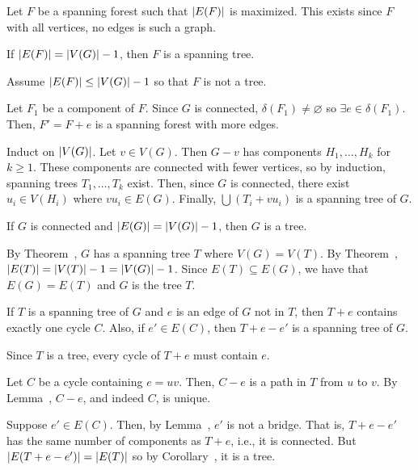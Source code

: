 \begin{prf}
  Let $F$ be a spanning forest such that $\abs{E(F)}$ is maximized.
  This exists since $F$ with all vertices, no edges is such a graph.

  If $\abs{E(F)} = \abs{V(G)} - 1$,
  then $F$ is a spanning tree.

  Assume $\abs{E(F)} \leq \abs{V(G)} - 1$
  so that $F$ is not a tree.

  Let $F_1$ be a component of $F$.
  Since $G$ is connected, $\delta(F_1) \neq \varnothing$
  so $\exists e \in \delta(F_1)$.
  Then, $F' = F + e$ is a spanning forest with more edges.
\end{prf}

\begin{prf}[cute]
  Induct on $\abs{V(G)}$.
  Let $v \in V(G)$. Then $G-v$ has components $H_1,\dotsc,H_k$ for $k \geq 1$.
  These components are connected with fewer vertices,
  so by induction, spanning trees $T_1,\dotsc,T_k$ exist.
  Then, since $G$ is connected, there exist $u_i \in V(H_i)$ where $vu_i \in E(G)$.
  Finally, $\bigcup (T_i + vu_i)$ is a spanning tree of $G$.
\end{prf}

\begin{corollary}[5.2.2]\label{cor:treenum}
  If $G$ is connected and $\abs{E(G)} = \abs{V(G)} - 1$, then $G$ is a tree.
\end{corollary}
\begin{prf}
  By Theorem~, $G$ has a spanning tree $T$ where $V(G) = V(T)$.
  By Theorem~, $\abs{E(T)} = \abs{V(T)} - 1 = \abs{V(G)} - 1$.
  Since $E(T) \subseteq E(G)$, we have that $E(G) = E(T)$ and $G$ is the tree $T$.
\end{prf}

\begin{theorem}[5.2.3]
  If $T$ is a spanning tree of $G$ and $e$ is an edge of $G$ not in $T$,
  then $T + e$ contains exactly one cycle $C$.
  Also, if $e' \in E(C)$, then $T + e - e'$ is a spanning tree of $G$.
\end{theorem}\spewnotes
\begin{prf}
  Since $T$ is a tree, every cycle of $T+e$ must contain $e$.

  Let $C$ be a cycle containing $e = uv$.
  Then, $C-e$ is a path in $T$ from $u$ to $v$.
  By Lemma~, $C-e$, and indeed $C$, is unique.

  Suppose $e' \in E(C)$.
  Then, by Lemma~, $e'$ is not a bridge.
  That is, $T+e-e'$ has the same number of components as $T+e$, i.e., it is connected.
  But $\abs{E(T+e-e')} = \abs{E(T)}$ so by Corollary~, it is a tree.
\end{prf}

